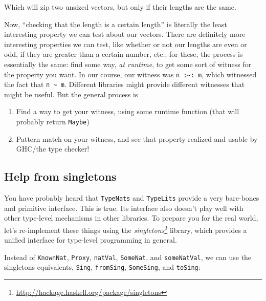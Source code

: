 \documentclass[]{article}
\renewcommand{\href}[2]{#2\footnote{\url{#1}}}
\begin{document}
Which will zip two unsized vectors, but only if their lengths are the same.

Now, ``checking that the length is a certain length'' is literally the least
interesting property we can test about our vectors. There are definitely more
interesting properties we can test, like whether or not our lengths are even or
odd, if they are greater than a certain number, etc.; for these, the process is
essentially the same: find some way, \emph{at runtime}, to get some sort of
witness for the property you want. In our course, our witness was
\texttt{n\ :\textasciitilde{}:\ m}, which witnessed the fact that
\texttt{n\ \textasciitilde{}\ m}. Different libraries might provide different
witnesses that might be useful. But the general process is

\begin{enumerate}
\def\labelenumi{\arabic{enumi}.}
\tightlist
\item
  Find a way to get your witness, using some runtime function (that will
  probably return \texttt{Maybe})
\item
  Pattern match on your witness, and see that property realized and usable by
  GHC/the type checker!
\end{enumerate}

\subsection{Help from singletons}\label{help-from-singletons}

You have probably heard that \texttt{TypeNats} and \texttt{TypeLits} provide a
very bare-bones and primitive interface. This is true. Its interface also
doesn't play well with other type-level mechanisms in other libraries. To
prepare you for the real world, let's re-implement these things using the
\emph{\href{http://hackage.haskell.org/package/singletons}{singletons}} library,
which provides a unified interface for type-level programming in general.

Instead of \texttt{KnownNat}, \texttt{Proxy}, \texttt{natVal}, \texttt{SomeNat},
and \texttt{someNatVal}, we can use the singletons equivalents, \texttt{Sing},
\texttt{fromSing}, \texttt{SomeSing}, and \texttt{toSing}:
\end{document}
